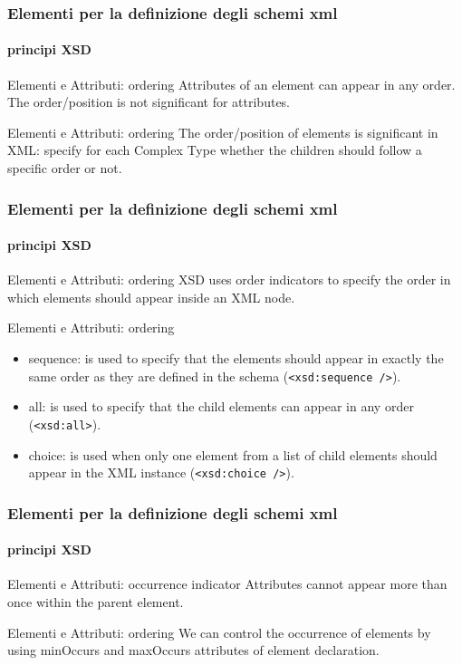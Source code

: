 \begin{frame}
	\frametitle{Elementi per la definizione degli schemi xml}
	\framesubtitle{principi XSD}
	\addtocounter{nframe}{1}

	\begin{block}{Elementi e Attributi: ordering}
		Attributes of an element can appear in any order. The order/position is not significant for attributes.

	\end{block}

	\begin{block}{Elementi e Attributi: ordering}
		The order/position of elements is significant in XML: specify for each Complex Type whether the children should follow a specific order or not.
	\end{block}
\end{frame}


\begin{frame}
	\frametitle{Elementi per la definizione degli schemi xml}
	\framesubtitle{principi XSD}
	\addtocounter{nframe}{1}

	\begin{block}{Elementi e Attributi: ordering}
		XSD uses order indicators to specify the order in which elements should appear inside an XML node.
	\end{block}

	\begin{block}{Elementi e Attributi: ordering}
		\begin{itemize}
			\item sequence: is used to specify that the elements should appear in exactly the same order as they are defined in the schema (\texttt{<xsd:sequence />}).
			\item all: is used to specify that the child elements can appear in any order (\texttt{<xsd:all>}).
			\item choice: is used when only one element from a list of child elements should appear in the XML instance (\texttt{<xsd:choice />}).
		\end{itemize}
	\end{block}
\end{frame}

\begin{frame}
	\frametitle{Elementi per la definizione degli schemi xml}
	\framesubtitle{principi XSD}
	\addtocounter{nframe}{1}

	\begin{block}{Elementi e Attributi: occurrence indicator}
		Attributes cannot appear more than once within the parent element.
	\end{block}

	\begin{block}{Elementi e Attributi: ordering}
		We can control the occurrence of elements by using minOccurs and maxOccurs attributes of element declaration.
	\end{block}
\end{frame}



